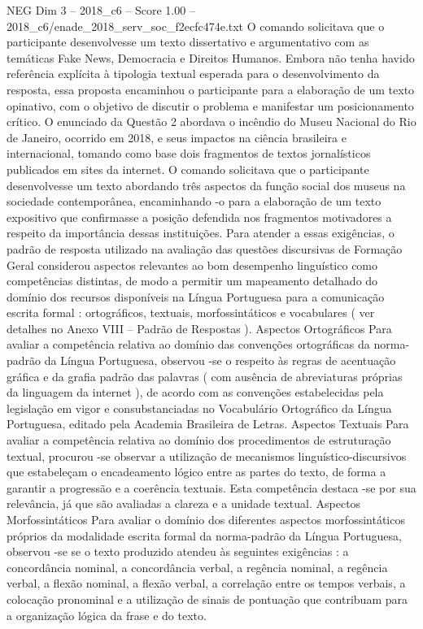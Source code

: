 \begin{textsample}{NEG Dim 3 – 2018\_c6 – Score 1.00 – 2018\_c6/enade\_2018\_serv\_soc\_f2ecfc474e.txt}
O comando solicitava que o participante desenvolvesse um texto dissertativo e argumentativo com as temáticas Fake News, Democracia e Direitos Humanos.
Embora não tenha havido referência explícita à tipologia textual esperada para o desenvolvimento da resposta, essa proposta encaminhou o participante para a elaboração de um texto opinativo, com o objetivo de discutir o problema e manifestar um posicionamento crítico.
O enunciado da Questão 2 abordava o incêndio do Museu Nacional do Rio de Janeiro, ocorrido em 2018, e seus impactos na ciência brasileira e internacional, tomando como base dois fragmentos de textos jornalísticos publicados em sites da internet.
O comando solicitava que o participante desenvolvesse um texto abordando três aspectos da função social dos museus na sociedade contemporânea, encaminhando -o para a elaboração de um texto expositivo que confirmasse a posição defendida nos fragmentos motivadores a respeito da importância dessas instituições.
Para atender a essas exigências, o padrão de resposta utilizado na avaliação das questões discursivas de Formação Geral considerou aspectos relevantes ao bom desempenho linguístico como competências distintas, de modo a permitir um mapeamento detalhado do domínio dos recursos disponíveis na Língua Portuguesa para a comunicação escrita formal : ortográficos, textuais, morfossintáticos e vocabulares ( ver detalhes no Anexo VIII – Padrão de Respostas ).
Aspectos Ortográficos Para avaliar a competência relativa ao domínio das convenções ortográficas da norma-padrão da Língua Portuguesa, observou -se o respeito às regras de acentuação gráfica e da grafia padrão das palavras ( com ausência de abreviaturas próprias da linguagem da internet ), de acordo com as convenções estabelecidas pela legislação em vigor e consubstanciadas no Vocabulário Ortográfico da Língua Portuguesa, editado pela Academia Brasileira de Letras.
Aspectos Textuais Para avaliar a competência relativa ao domínio dos procedimentos de estruturação textual, procurou -se observar a utilização de mecanismos linguístico-discursivos que estabeleçam o encadeamento lógico entre as partes do texto, de forma a garantir a progressão e a coerência textuais.
Esta competência destaca -se por sua relevância, já que são avaliadas a clareza e a unidade textual.
Aspectos Morfossintáticos Para avaliar o domínio dos diferentes aspectos morfossintáticos próprios da modalidade escrita formal da norma-padrão da Língua Portuguesa, observou -se se o texto produzido atendeu às seguintes exigências : a concordância nominal, a concordância verbal, a regência nominal, a regência verbal, a flexão nominal, a flexão verbal, a correlação entre os tempos verbais, a colocação pronominal e a utilização de sinais de pontuação que contribuam para a organização lógica da frase e do texto.

\end{textsample}

